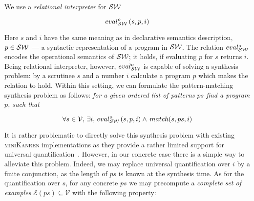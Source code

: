 \begin{comment}
Algebraic data types are essential for typed functional programming and it's difficult to imagine effective compiler without effective compilation of pattern matching. 
There are a few different approaches for compiling pattern mathcing. GHC is using influential paper~\cite{Jones1987}, OCaml is currently based on~\cite{maranget2001} although a work~\cite{maranget2008} can slightly improve effectiveness of generated code. 

Also there are a number of possible extensions of pattern matching itself (guards, non-linear patterns, active patterns) and extensions of possible matchable values (polymorphic variants in OCaml, for example). Although having all these extensions can be helpful for programming in practice, they can complicate compilation schema or make it very difficult to generate effective code. Supporting a large number  of extensions can seriously complicate compiler's implementation too.

We present an approach to pattern matching code generation based on application of relational programming~\cite{TRS,WillThesis} and, in
 particular, relational interpreters~\cite{unified}. We expect that our approach can compile pattern mathcing to competitive code and will be easier to support during adding of new pattern matching extensions.
 
\end{comment}
 We use a \emph{relational interpreter} for $\mathcal{S}\mathcal{W}$
 
 \[
 eval^o_{\mathcal{S}\mathcal{W}}\, (s, p, i)
 \]
 
 Here $s$ and $i$ have the same meaning as in declarative semantics description, $p\in\mathcal{S}\mathcal{W}$~--- a syntactic representation of
 a program in $\mathcal{S}\mathcal{W}$. The relation $eval^o_{\mathcal{S}\mathcal{W}}$ encodes the operational semantics of $\mathcal{S}\mathcal{W}$; it holds, if
 evaluating $p$ for $s$ returns $i$. Being relational interpreter, however, $eval^o_{\mathcal{S}\mathcal{W}}$ is capable of solving a
 synthesis problem: by a scrutinee $s$ and a number $i$ calculate a program $p$ which makes the relation to hold.
 Within this setting, we can formulate the pattern-matching synthesis problem as follows: \emph{for a given ordered list of patterns $ps$ find a program $p$, such that}
 
 \[
 \forall s\in\mathcal{V},\,\exists i,\,eval^o_{\mathcal{S}\mathcal{W}}\, (s, p, i) \wedge\, match (s, ps, i)
 \]
 
 It is rather problematic to directly solve this synthesis problem with existing \textsc{miniKanren} implementations as
 they provide a rather limited support for universal quantification~\cite{eigen,moiseenko}. However, in our concrete
 case there is a simple way to alleviate this problem. Indeed, we may replace universal quantification over $i$ by
 a finite conjunction, as the length of $ps$ is known at the synthesis time. As for the quantification over $s$, for
 any concrete $ps$ we may precompute a \emph{complete set of examples} $\mathcal{E}(ps)\subseteq\mathcal{V}$ with the following
 property:
 
